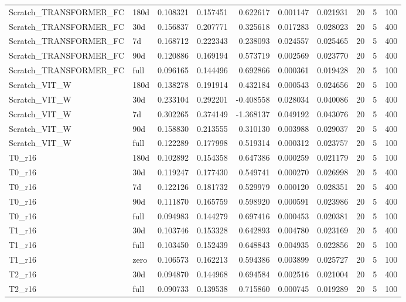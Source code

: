 \begin{tabular}{llrrrrrrrr}
Scratch\_TRANSFORMER\_FC & 180d & 0.108321 & 0.157451 & 0.622617 & 0.001147 & 0.021931 & 20 & 5 & 100 \\
Scratch\_TRANSFORMER\_FC & 30d & 0.156837 & 0.207771 & 0.325618 & 0.017283 & 0.028023 & 20 & 5 & 400 \\
Scratch\_TRANSFORMER\_FC & 7d & 0.168712 & 0.222343 & 0.238093 & 0.024557 & 0.025465 & 20 & 5 & 400 \\
Scratch\_TRANSFORMER\_FC & 90d & 0.120886 & 0.169194 & 0.573719 & 0.002569 & 0.023770 & 20 & 5 & 400 \\
Scratch\_TRANSFORMER\_FC & full & 0.096165 & 0.144496 & 0.692866 & 0.000361 & 0.019428 & 20 & 5 & 100 \\
Scratch\_VIT\_W & 180d & 0.138278 & 0.191914 & 0.432184 & 0.000543 & 0.024656 & 20 & 5 & 100 \\
Scratch\_VIT\_W & 30d & 0.233104 & 0.292201 & -0.408558 & 0.028034 & 0.040086 & 20 & 5 & 400 \\
Scratch\_VIT\_W & 7d & 0.302265 & 0.374149 & -1.368137 & 0.049192 & 0.043076 & 20 & 5 & 400 \\
Scratch\_VIT\_W & 90d & 0.158830 & 0.213555 & 0.310130 & 0.003988 & 0.029037 & 20 & 5 & 400 \\
Scratch\_VIT\_W & full & 0.122289 & 0.177998 & 0.519314 & 0.000312 & 0.023757 & 20 & 5 & 100 \\
T0\_r16 & 180d & 0.102892 & 0.154358 & 0.647386 & 0.000259 & 0.021179 & 20 & 5 & 100 \\
T0\_r16 & 30d & 0.119247 & 0.177430 & 0.549741 & 0.000270 & 0.026998 & 20 & 5 & 400 \\
T0\_r16 & 7d & 0.122126 & 0.181732 & 0.529979 & 0.000120 & 0.028351 & 20 & 5 & 400 \\
T0\_r16 & 90d & 0.111870 & 0.165759 & 0.598920 & 0.000591 & 0.023986 & 20 & 5 & 400 \\
T0\_r16 & full & 0.094983 & 0.144279 & 0.697416 & 0.000453 & 0.020381 & 20 & 5 & 100 \\
T1\_r16 & 30d & 0.103746 & 0.153328 & 0.642893 & 0.004780 & 0.023169 & 20 & 5 & 400 \\
T1\_r16 & full & 0.103450 & 0.152439 & 0.648843 & 0.004935 & 0.022856 & 20 & 5 & 100 \\
T1\_r16 & zero & 0.106573 & 0.162213 & 0.594386 & 0.003899 & 0.025727 & 20 & 5 & 100 \\
T2\_r16 & 30d & 0.094870 & 0.144968 & 0.694584 & 0.002516 & 0.021004 & 20 & 5 & 400 \\
T2\_r16 & full & 0.090733 & 0.139538 & 0.715860 & 0.000745 & 0.019289 & 20 & 5 & 100 \\

\end{tabular}
